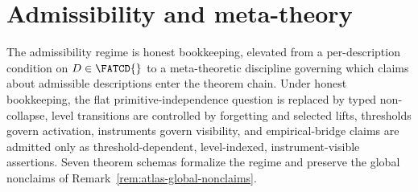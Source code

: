 \section{Admissibility and meta-theory}\label{sec:admissibility-meta-theory}

%
%

The admissibility regime is honest bookkeeping, elevated from a
per-description condition on \(D \in \FATCD{}\) to a meta-theoretic
discipline governing which claims about admissible descriptions enter
the theorem chain. Under honest bookkeeping, the flat
primitive-independence question is replaced by typed non-collapse,
level transitions are controlled by forgetting and selected lifts,
thresholds govern activation, instruments govern visibility, and
empirical-bridge claims are admitted only as threshold-dependent,
level-indexed, instrument-visible assertions. Seven theorem schemas
formalize the regime and preserve the global nonclaims of
Remark~\ref{rem:atlas-global-nonclaims}.


